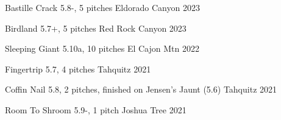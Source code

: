 



\begin{cvhonors}

  \cvhonor
    {Bastille Crack} %
    {5.8-, 5 pitches} %
    {Eldorado Canyon} %
    {2023} %

  \cvhonor
    {Birdland} %
    {5.7+, 5 pitches} %
    {Red Rock Canyon} %
    {2023} %

  \cvhonor
    {Sleeping Giant} %
    {5.10a, 10 pitches} %
    {El Cajon Mtn} %
    {2022} %

  \cvhonor
    {Fingertrip} %
    {5.7, 4 pitches} %
    {Tahquitz} %
    {2021} %

  \cvhonor
    {Coffin Nail} %
    {5.8, 2 pitches, finished on Jensen's Jaunt (5.6)} %
    {Tahquitz} %
    {2021} %

  \cvhonor
    {Room To Shroom} %
    {5.9-, 1 pitch} %
    {Joshua Tree} %
    {2021} %

\end{cvhonors}


